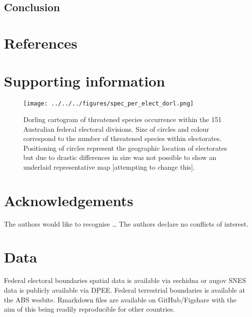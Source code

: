 \documentclass[a4paper,11pt]{article}
\begin{document}
\subsection{Conclusion}

\newpage
\nolinenumbers
\section{References}
\printbibliography

\newpage
\section{Supporting information}

\begin{figure}[H]
	\centering
    \texttt{[image: ../../../figures/spec\_per\_elect\_dorl.png]}
    \caption{Dorling cartogram of threatened species occurrence within the 151 Australian federal electoral divisions. Size of circles and colour correspond to the number of threatened species within electorates. Positioning of circles represent the geographic location of electorates but due to drastic differences in size was not possible to show an underlaid representative map [attempting to change this].}
    \label{fig:dorl}
\end{figure}

\newpage
\section{Acknowledgements}
The authors would like to recognise \ldots
The authors declare no conflicts of interest.

\newpage
\section{Data}
Federal electoral boundaries spatial data is available via eechidna or augov
SNES data is publicly available via DPEE.
Federal terrestrial boundaries is available at the ABS wesbite.
Rmarkdown files are available on GitHub/Figshare with the aim of this being readily reproducible for other countries.
\end{document}
